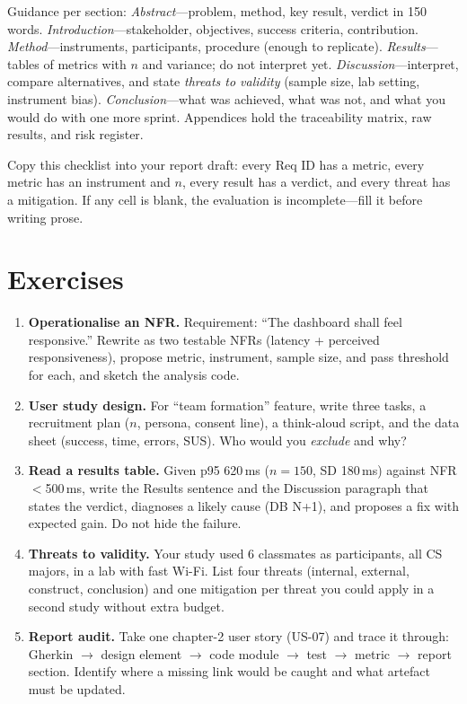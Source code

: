 Guidance per section: \emph{Abstract}---problem, method, key result, verdict in 150 words. \emph{Introduction}---stakeholder, objectives, success criteria, contribution. \emph{Method}---instruments, participants, procedure (enough to replicate). \emph{Results}---tables of metrics with $n$ and variance; do not interpret yet. \emph{Discussion}---interpret, compare alternatives, and state \emph{threats to validity} (sample size, lab setting, instrument bias). \emph{Conclusion}---what was achieved, what was not, and what you would do with one more sprint. Appendices hold the traceability matrix, raw results, and risk register.

\begin{remark}
Copy this checklist into your report draft: every Req ID has a metric, every metric has an instrument and $n$, every result has a verdict, and every threat has a mitigation. If any cell is blank, the evaluation is incomplete---fill it before writing prose.
\end{remark}

\section{Exercises}
\label{sec:ch07-exercises}
\begin{enumerate}[label=E7.\arabic*, leftmargin=*, itemsep=0.6em]
    \item \textbf{Operationalise an NFR.} Requirement: ``The dashboard shall feel responsive.'' Rewrite as two testable NFRs (latency + perceived responsiveness), propose metric, instrument, sample size, and pass threshold for each, and sketch the analysis code.
    \item \textbf{User study design.} For ``team formation'' feature, write three tasks, a recruitment plan ($n$, persona, consent line), a think-aloud script, and the data sheet (success, time, errors, SUS). Who would you \emph{exclude} and why?
    \item \textbf{Read a results table.} Given p95 620\,ms ($n=150$, SD 180\,ms) against NFR $<$500\,ms, write the Results sentence and the Discussion paragraph that states the verdict, diagnoses a likely cause (DB N+1), and proposes a fix with expected gain. Do not hide the failure.
    \item \textbf{Threats to validity.} Your study used 6 classmates as participants, all CS majors, in a lab with fast Wi-Fi. List four threats (internal, external, construct, conclusion) and one mitigation per threat you could apply in a second study without extra budget.
    \item \textbf{Report audit.} Take one chapter-2 user story (US-07) and trace it through: Gherkin $\to$ design element $\to$ code module $\to$ test $\to$ metric $\to$ report section. Identify where a missing link would be caught and what artefact must be updated.
\end{enumerate}
